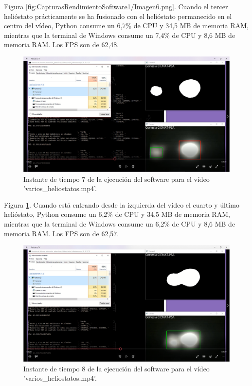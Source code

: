 Figura \ref{fig:CapturasRendimientoSoftware1/Imagen6.png}. Cuando el tercer helióstato prácticamente se ha fusionado con el helióstato permanecido en el centro del vídeo, Python consume un 6,7\% de CPU y 34,5 MB de memoria RAM, mientras que la terminal de Windows consume un 7,4\% de CPU y 8,6 MB de memoria RAM. Los FPS son de 62,48.\\[20pt]

\begin{figure}[h!]
  	\centering
	\includegraphics[width=\textwidth]{CapturasRendimientoSoftware1/Imagen7.png}
	\caption{Instante de tiempo 7 de la ejecución del software para el vídeo 'varios\_heliostatos.mp4'.
	\label{fig:CapturasRendimientoSoftware1/Imagen7.png}}
\end{figure}

Figura \ref{fig:CapturasRendimientoSoftware1/Imagen7.png}. Cuando está entrando desde la izquierda del vídeo el cuarto y último helióstato, Python consume un 6,2\% de CPU y 34,5 MB de memoria RAM, mientras que la terminal de Windows consume un 6,2\% de CPU y 8,6 MB de memoria RAM. Los FPS son de 62,57.\\[20pt]

\begin{figure}[h!]
  	\centering
	\includegraphics[width=\textwidth]{CapturasRendimientoSoftware1/Imagen8.png}
	\caption{Instante de tiempo 8 de la ejecución del software para el vídeo 'varios\_heliostatos.mp4'.
	\label{fig:CapturasRendimientoSoftware1/Imagen8.png}}
\end{figure}

